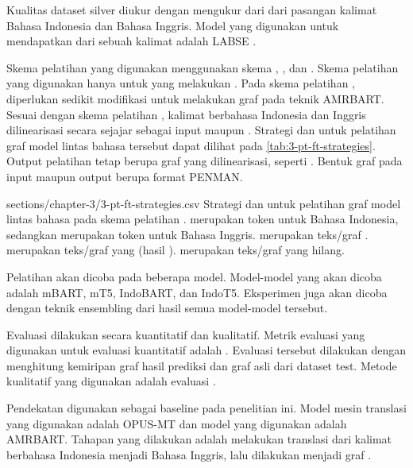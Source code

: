 Kualitas dataset silver diukur dengan mengukur \cossim{} dari \multil{}  dari pasangan kalimat Bahasa Indonesia dan Bahasa Inggris.
Model \mwordem{} yang digunakan untuk mendapatkan \multil{}  dari sebuah kalimat adalah \gls{LABSE} .

Skema pelatihan yang digunakan menggunakan skema , , dan .
Skema pelatihan yang digunakan hanya untuk yang melakukan \amrparsing{}.
Pada skema pelatihan , diperlukan sedikit modifikasi untuk melakukan \pretraining{} graf pada teknik \gls{AMRBART}.
Sesuai dengan skema pelatihan , kalimat berbahasa Indonesia dan Inggris dilinearisasi secara sejajar sebagai input \pretraining{} maupun \finetuning{}.
Strategi \pretraining{} dan \finetuning{} untuk pelatihan graf model \amrparsing{} lintas bahasa tersebut dapat dilihat pada \cref{tab:3-pt-ft-strategies}.
Output pelatihan tetap berupa graf \AMR{} yang dilinearisasi, seperti .
Bentuk graf pada input maupun output berupa format PENMAN.

  {sections/chapter-3/3-pt-ft-strategies.csv}
  {
    Strategi \pretraining{} dan \finetuning{} untuk pelatihan graf model \amrparsing{} lintas bahasa pada skema pelatihan .
     merupakan token untuk Bahasa Indonesia, sedangkan  merupakan token untuk Bahasa Inggris.
     merupakan teks/graf .
     merupakan teks/graf yang  (hasil \denoising{}).
     merupakan teks/graf yang hilang.
  }

Pelatihan \amrparsing{} akan dicoba pada beberapa \multil{} model.
Model-model yang akan dicoba adalah mBART, mT5, IndoBART, dan IndoT5.
Eksperimen \amrparsing{} juga akan dicoba dengan teknik \AMR{} ensembling  dari hasil semua model-model tersebut.

Evaluasi dilakukan secara kuantitatif dan kualitatif.
Metrik evaluasi yang digunakan untuk evaluasi kuantitatif adalah \SMATCH{}.
Evaluasi tersebut dilakukan dengan menghitung kemiripan graf \AMR{} hasil prediksi dan graf \AMR{} asli dari dataset test.
Metode kualitatif yang digunakan adalah evaluasi \transdiver{}.

Pendekatan   digunakan sebagai baseline pada penelitian ini.
Model mesin translasi yang digunakan adalah {OPUS-MT} dan model \amrparsing{} yang digunakan adalah \gls{AMRBART}.
Tahapan yang dilakukan adalah melakukan translasi dari kalimat berbahasa Indonesia menjadi Bahasa Inggris, lalu dilakukan \amrparsing{} menjadi graf \AMR{}.
